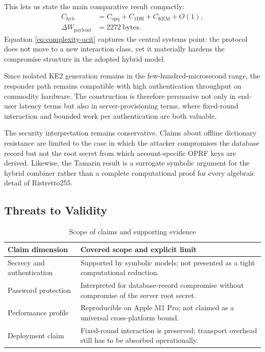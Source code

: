 \documentclass[conference]{IEEEtran}
\begin{document}
This lets us state the main comparative result compactly:
\begin{equation}
\begin{aligned}
C_{\mathrm{hyb}} &= C_{\mathrm{opq}} + C_{\mathrm{1DH}} + C_{\mathrm{KEM}} + O(1), \\
\Delta W_{\mathrm{payload}} &= 2272~\mathrm{bytes}.
\end{aligned}
\label{eq:complexity-acit}
\end{equation}
Equation \eqref{eq:complexity-acit} captures the central systems point: the protocol does not move to a new interaction class, yet it materially hardens the compromise structure in the adopted hybrid model.

Since isolated KE2 generation remains in the few-hundred-microsecond range, the responder path remains compatible with high authentication throughput on commodity hardware. The construction is therefore persuasive not only in end-user latency terms but also in server-provisioning terms, where fixed-round interaction and bounded work per authentication are both valuable.

The security interpretation remains conservative. Claims about offline dictionary resistance are limited to the case in which the attacker compromises the database record but not the root secret from which account-specific OPRF keys are derived. Likewise, the Tamarin result is a surrogate symbolic argument for the hybrid combiner rather than a complete computational proof for every algebraic detail of Ristretto255.

\subsection{Threats to Validity}

\begin{table}[t]
\caption{Scope of claims and supporting evidence}
\label{tab:acit-scope}
\centering
\footnotesize
\begin{tabularx}{\columnwidth}{@{}L{2.1cm}Y@{}}
\toprule
Claim dimension & Covered scope and explicit limit \\
\midrule
Secrecy and authentication & Supported by symbolic models; not presented as a tight computational reduction. \\
Password protection & Interpreted for database-record compromise without compromise of the server root secret. \\
Performance profile & Reproducible on Apple M1 Pro; not claimed as a universal cross-platform bound. \\
Deployment claim & Fixed-round interaction is preserved; transport overhead still has to be absorbed operationally. \\
\bottomrule
\end{tabularx}
\end{table}
\end{document}
